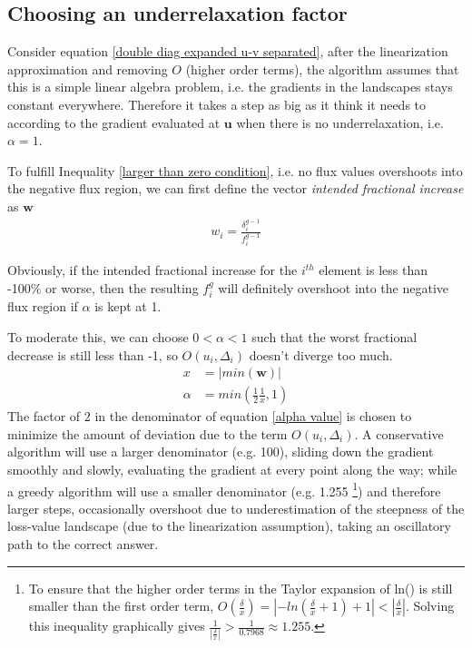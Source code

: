 \documentclass[a4paper, 12pt]{article}
\newcommand{\ve}[1]{\boldsymbol{#1}}
\begin{document}
\begin{appendices}
\section{Choosing an underrelaxation factor}\label{underrelaxation factor}
Consider equation \ref{double diag expanded u-v separated}, 
after the linearization approximation and removing $O$ (higher order terms), the algorithm assumes that this is a simple linear algebra problem, i.e. the gradients in the landscapes stays constant everywhere. Therefore it takes a step as big as it think it needs to according to the gradient evaluated at $\ve{u}$ when there is no underrelaxation, i.e. $\alpha=1$.

To fulfill Inequality \ref{larger than zero condition}, i.e. no flux values overshoots into the negative flux region, we can first define the vector \emph{intended fractional increase} as $\ve{w}$
\begin{align}
    w_i = \frac{\delta^{g-1}_i}{f^{g-1}_i}
\end{align}

Obviously, if the intended fractional increase for the $i^{th}$ element is less than -100\% or worse, then the resulting $f^g_i$ will definitely overshoot into the negative flux region if $\alpha$ is kept at 1.

To moderate this, we can choose $0 <\alpha <1$ such that the worst fractional decrease is still less than -1, so $O(u_i,\Delta_i)$ doesn't diverge too much.
% 
% 
% 
\begin{align}
    x &= |min(\ve{w})|\\
\alpha&= min(\frac{1}{2}\frac{1}{x}, 1) \label{alpha value}
\end{align}
The factor of $2$ in the denominator of equation \ref{alpha value} is chosen to minimize the amount of deviation due to the term $O(u_i, \Delta_i)$. A conservative algorithm will use a larger denominator (e.g. 100), sliding down the gradient smoothly and slowly, evaluating the gradient at every point along the way; while a greedy algorithm will use a smaller denominator (e.g. 1.255 \footnote{To ensure that the higher order terms in the Taylor expansion of ln() is still smaller than the first order term, $O(\frac{\delta}{x}) = |-ln(\frac{\delta}{x}+1)+1| < |\frac{\delta}{x}|$. Solving this inequality graphically gives $\frac{1}{|\frac{\delta}{x}|} >\frac{1}{0.7968} \approx 1.255$.}) and therefore larger steps, occasionally overshoot due to underestimation of the steepness of the loss-value landscape (due to the linearization assumption), taking an oscillatory path to the correct answer.


\end{appendices}
\end{document}

